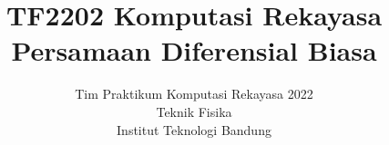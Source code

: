 



\title{%
{\small TF2202 Komputasi Rekayasa}\\
Persamaan Diferensial Biasa
}
\author{Tim Praktikum Komputasi Rekayasa 2022\\
Teknik Fisika\\
Institut Teknologi Bandung}
\date{}
\maketitle






